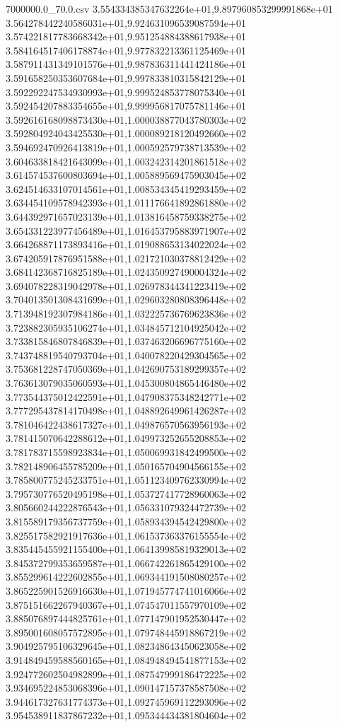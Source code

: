 \begin{filecontents*}{7000000.0_70.0.csv}
3.554334385347632264e+01,9.897960853299991868e+01
3.564278442240586031e+01,9.924631096539087594e+01
3.574221817783668342e+01,9.951254884388617938e+01
3.584164517406178874e+01,9.977832213361125469e+01
3.587911431349101576e+01,9.987836311441424186e+01
3.591658250353607684e+01,9.997833810315842129e+01
3.592292247534930993e+01,9.999524853778075340e+01
3.592454207883354655e+01,9.999956817075781146e+01
3.592616168098873430e+01,1.000038877043780303e+02
3.592804924043425530e+01,1.000089218120492660e+02
3.594692470926413819e+01,1.000592579738713539e+02
3.604633818421643099e+01,1.003242314201861518e+02
3.614574537600803694e+01,1.005889569475903045e+02
3.624514633107014561e+01,1.008534345419293459e+02
3.634454109578942393e+01,1.011176641892861880e+02
3.644392971657023139e+01,1.013816458759338275e+02
3.654331223977456489e+01,1.016453795883971907e+02
3.664268871173893416e+01,1.019088653134022024e+02
3.674205917876951588e+01,1.021721030378812429e+02
3.684142368716825189e+01,1.024350927490004324e+02
3.694078228319042978e+01,1.026978344341223419e+02
3.704013501308431699e+01,1.029603280808396448e+02
3.713948192307984186e+01,1.032225736769623836e+02
3.723882305935106274e+01,1.034845712104925042e+02
3.733815846807846839e+01,1.037463206696775160e+02
3.743748819540793704e+01,1.040078220429304565e+02
3.753681228747050369e+01,1.042690753189299357e+02
3.763613079035060593e+01,1.045300804865446480e+02
3.773544375012422591e+01,1.047908375348242771e+02
3.777295437814170498e+01,1.048892649961426287e+02
3.781046422438617327e+01,1.049876570563956193e+02
3.781415070642288612e+01,1.049973252655208853e+02
3.781783715598923834e+01,1.050069931842499500e+02
3.782148906455785209e+01,1.050165704904566155e+02
3.785800775245233751e+01,1.051123409762330994e+02
3.795730776520495198e+01,1.053727417728960063e+02
3.805660244222876543e+01,1.056331079324472739e+02
3.815589179356737759e+01,1.058934394542429800e+02
3.825517582921917636e+01,1.061537363376155554e+02
3.835445455921155400e+01,1.064139985819329013e+02
3.845372799353659587e+01,1.066742261865429100e+02
3.855299614222602855e+01,1.069344191508080257e+02
3.865225901526916630e+01,1.071945774741016066e+02
3.875151662267940367e+01,1.074547011557970109e+02
3.885076897444825761e+01,1.077147901952530447e+02
3.895001608057572895e+01,1.079748445918867219e+02
3.904925795106329645e+01,1.082348643450623058e+02
3.914849459588560165e+01,1.084948494541877153e+02
3.924772602504982899e+01,1.087547999186472225e+02
3.934695224853068396e+01,1.090147157378587508e+02
3.944617327631774373e+01,1.092745969112293096e+02
3.954538911837867232e+01,1.095344434381804604e+02

\end{filecontents*}

